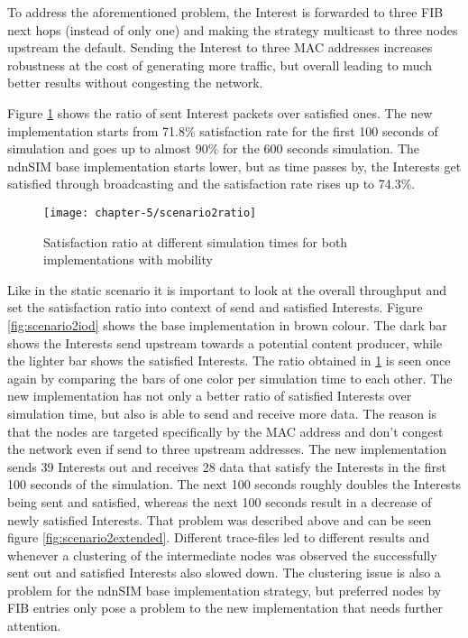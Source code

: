To address the aforementioned problem, the Interest is forwarded to three FIB next hops (instead of only one) and making the strategy multicast to three nodes upstream the default. Sending the Interest to three MAC addresses increases robustness at the cost of generating more traffic, but overall leading to much better results without congesting the network.

Figure \ref{fig:scenario2ratio} shows the ratio of sent Interest packets over satisfied ones. The new implementation starts from 71.8\% satisfaction rate for the first 100 seconds of simulation and goes up to almost 90\% for the 600 seconds simulation. The ndnSIM base implementation starts lower, but as time passes by, the Interests get satisfied through broadcasting and the satisfaction rate rises up to 74.3\%.

\begin{figure}[H]
  \centering
  \texttt{[image: chapter-5/scenario2ratio]}
  \caption{Satisfaction ratio at different simulation times for both implementations with mobility}
  \label{fig:scenario2ratio}
\end{figure}

\vspace{5mm} %

Like in the static scenario it is important to look at the overall throughput and set the satisfaction ratio into context of send and satisfied Interests. Figure \ref{fig:scenario2iod} shows the base implementation in brown colour. The dark bar shows the Interests send upstream towards a potential content producer, while the lighter bar shows the satisfied Interests. The ratio obtained in \ref{fig:scenario2ratio} is seen once again by comparing the bars of one color per simulation time to each other. The new implementation has not only a better ratio of satisfied Interests over simulation time, but also is able to send and receive more data. The reason is that the nodes are targeted specifically by the MAC address and don't congest the network even if send to three upstream addresses.
The new implementation sends 39 Interests out and receives 28 data that satisfy the Interests in the first 100 seconds of the simulation. The next 100 seconds roughly doubles the Interests being sent and satisfied, whereas the next 100 seconds result in a decrease of newly satisfied Interests. That problem was described above and can be seen figure \ref{fig:scenario2extended}. Different trace-files led to different results and whenever a clustering of the intermediate nodes was observed the successfully sent out and satisfied Interests also slowed down. The clustering issue is also a problem for the ndnSIM base implementation strategy, but preferred nodes by FIB entries only pose a problem to the new implementation that needs further attention.

